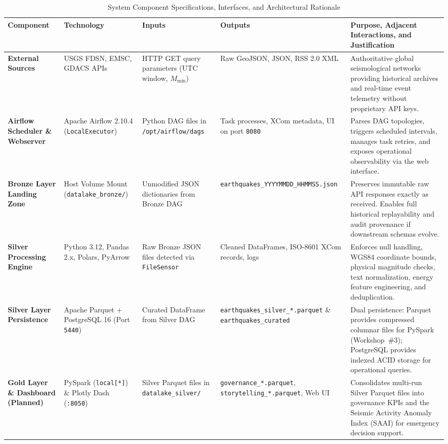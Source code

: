 \begin{table}[!t]
\caption{System Component Specifications, Interfaces, and Architectural Rationale}
\label{tab:components}
\centering
\footnotesize
\renewcommand{\arraystretch}{1.18}
\begin{tabularx}{\textwidth}{p{2.2cm} p{2.2cm} p{2.5cm} p{2.7cm} X}
\toprule
\textbf{Component} & \textbf{Technology} & \textbf{Inputs} & \textbf{Outputs} & \textbf{Purpose, Adjacent Interactions, and Justification} \\
\midrule
\textbf{External Sources} & USGS FDSN, EMSC, GDACS APIs & HTTP GET query parameters (UTC window, $M_{\min}$) & Raw GeoJSON, JSON, RSS 2.0 XML & Authoritative global seismological networks providing historical archives and real-time event telemetry without proprietary API keys. \\
\textbf{Airflow Scheduler \& Webserver} & Apache Airflow 2.10.4 (\texttt{LocalExecutor}) & Python DAG files in \texttt{/opt/airflow/dags} & Task processes, XCom metadata, UI on port \texttt{8080} & Parses DAG topologies, triggers scheduled intervals, manages task retries, and exposes operational observability via the web interface. \\
\textbf{Bronze Layer Landing Zone} & Host Volume Mount (\texttt{datalake\_bronze/}) & Unmodified JSON dictionaries from Bronze DAG & \texttt{earthquakes\_}\allowbreak\texttt{YYYYMMDD\_}\allowbreak\texttt{HHMMSS.json} & Preserves immutable raw API responses exactly as received. Enables full historical replayability and audit provenance if downstream schemas evolve. \\
\textbf{Silver Processing Engine} & Python 3.12, Pandas 2.x, Polars, PyArrow & Raw Bronze JSON files detected via \texttt{FileSensor} & Cleaned DataFrames, ISO-8601 XCom records, logs & Enforces null handling, WGS84 coordinate bounds, physical magnitude checks, text normalization, energy feature engineering, and deduplication. \\
\textbf{Silver Layer Persistence} & Apache Parquet + PostgreSQL 16 (Port \texttt{5440}) & Curated DataFrame from Silver DAG & \texttt{earthquakes\_}\allowbreak\texttt{silver\_*.parquet} \& \texttt{earthquakes\_}\allowbreak\texttt{curated} & Dual persistence: Parquet provides compressed columnar files for PySpark (Workshop~\#3); PostgreSQL provides indexed ACID storage for operational queries. \\
\textbf{Gold Layer \& Dashboard (Planned)} & PySpark (\texttt{local[*]}) \& Plotly Dash (\texttt{:8050}) & Silver Parquet files in \texttt{datalake\_}\allowbreak\texttt{silver/} & \texttt{governance\_*.parquet}, \allowbreak\texttt{storytelling\_*.parquet}, Web UI & Consolidates multi-run Silver Parquet files into governance KPIs and the Seismic Activity Anomaly Index (SAAI) for emergency decision support. \\
\bottomrule
\end{tabularx}
\end{table}

